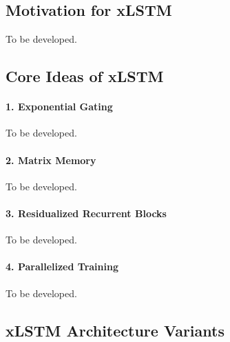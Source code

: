 \documentclass[11pt, oneside]{book}
\let\originalsubsection\subsection
\renewcommand{\subsection}{\Needspace{6\baselineskip}\originalsubsection}
\begin{document}
\subsection{Motivation for xLSTM}\label{sec:source-8-1-2}
{\small\color{gray!70!black} To be developed.}

\subsection{Core Ideas of xLSTM}\label{sec:source-8-1-3}

\paragraph{1. Exponential Gating}\label{sec:source-8-1-3-1}
{\small\color{gray!70!black} To be developed.}

\paragraph{2. Matrix Memory}\label{sec:source-8-1-3-2}
{\small\color{gray!70!black} To be developed.}

\paragraph{3. Residualized Recurrent Blocks}\label{sec:source-8-1-3-3}
{\small\color{gray!70!black} To be developed.}

\paragraph{4. Parallelized Training}\label{sec:source-8-1-3-4}
{\small\color{gray!70!black} To be developed.}

\subsection{xLSTM Architecture Variants}\label{sec:source-8-1-4}
\end{document}
